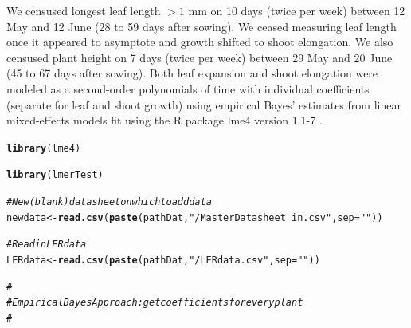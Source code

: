 \documentclass[11pt, oneside]{article}\usepackage[]{graphicx}\usepackage[]{color}
\makeatletter
\newcommand{\hlstr}[1]{\textcolor[rgb]{0.192,0.494,0.8}{#1}}%
\newcommand{\hlcom}[1]{\textcolor[rgb]{0.678,0.584,0.686}{\textit{#1}}}%
\newcommand{\hlstd}[1]{\textcolor[rgb]{0.345,0.345,0.345}{#1}}%
\newcommand{\hlkwb}[1]{\textcolor[rgb]{0.69,0.353,0.396}{#1}}%
\newcommand{\hlkwc}[1]{\textcolor[rgb]{0.333,0.667,0.333}{#1}}%
\newcommand{\hlkwd}[1]{\textcolor[rgb]{0.737,0.353,0.396}{\textbf{#1}}}%
\newenvironment{kframe}{%
 \def\at@end@of@kframe{}%
 \ifinner\ifhmode%
  \def\at@end@of@kframe{\end{minipage}}%
  \begin{minipage}{\columnwidth}%
 \fi\fi%
 \def\FrameCommand##1{\hskip\@totalleftmargin \hskip-\fboxsep
 \colorbox{shadecolor}{##1}\hskip-\fboxsep
     \hskip-\linewidth \hskip-\@totalleftmargin \hskip\columnwidth}%
 \MakeFramed {\advance\hsize-\width
   \@totalleftmargin\z@ \linewidth\hsize
   \@setminipage}}%
 {\par\unskip\endMakeFramed%
 \at@end@of@kframe}
\newenvironment{knitrout}{}{} %
\newcommand{\pkg}[1]{{\fontseries{b}\selectfont #1}}
\makeatother
\begin{document}
We censused longest leaf length $>1$ mm on 10 days (twice per week) between 12 May and 12 June (28 to 59 days after sowing). We ceased measuring leaf length once it appeared to asymptote and growth shifted to shoot elongation.  We also censused plant height on 7 days (twice per week) between 29 May and 20 June (45 to 67 days after sowing). Both leaf expansion and shoot elongation were modeled as a second-order polynomials of time with individual coefficients (separate for leaf and shoot growth) using empirical Bayes' estimates from linear mixed-effects models fit using the R package \pkg{lme4} version 1.1-7 \citep{Bates_etal_2014}.

\begin{knitrout}
\color{fgcolor}\begin{kframe}
\begin{alltt}
  \hlkwd{library}\hlstd{(lme4)}
\end{alltt}


{\ttfamily\noindent\itshape\color{messagecolor}{\#\# Loading required package: Matrix\\\#\# Loading required package: Rcpp}}\begin{alltt}
  \hlkwd{library}\hlstd{(lmerTest)}
\end{alltt}


{\ttfamily\noindent\itshape\color{messagecolor}{\#\# \\\#\# Attaching package: 'lmerTest'\\\#\# \\\#\# The following object is masked from 'package:lme4':\\\#\# \\\#\#\ \ \ \  lmer\\\#\# \\\#\# The following object is masked from 'package:stats':\\\#\# \\\#\#\ \ \ \  step}}\begin{alltt}
  \hlcom{# New (blank) datasheet on which to add data}
  \hlstd{newdata} \hlkwb{<-} \hlkwd{read.csv}\hlstd{(}\hlkwd{paste}\hlstd{(pathDat,} \hlstr{"/MasterDatasheet_in.csv"}\hlstd{,} \hlkwc{sep} \hlstd{=} \hlstr{""}\hlstd{))}

  \hlcom{# Read in LER data}
  \hlstd{LERdata} \hlkwb{<-} \hlkwd{read.csv}\hlstd{(}\hlkwd{paste}\hlstd{(pathDat,} \hlstr{"/LERdata.csv"}\hlstd{,} \hlkwc{sep} \hlstd{=} \hlstr{""}\hlstd{))}

  \hlcom{#}
        \hlcom{# Empirical Bayes Approach: get coefficients for every plant}
        \hlcom{#}


\end{alltt}
\end{kframe}
\end{knitrout}
\end{document}
